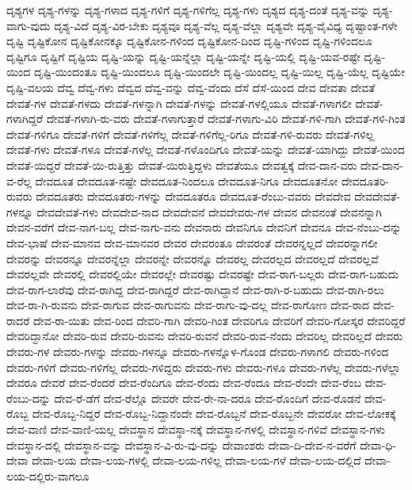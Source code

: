 {ದೃಶ್ಯಗಳ
ದೃಶ್ಯ-ಗಳನ್ನು
ದೃಶ್ಯ-ಗಳಾದ
ದೃಶ್ಯ-ಗಳಿಗೆ
ದೃಶ್ಯ-ಗಳಿಗೆಲ್ಲ
ದೃಶ್ಯ-ಗಳು
ದೃಶ್ಯದ
ದೃಶ್ಯ-ದಂತೆ
ದೃಶ್ಯ-ವನ್ನು
ದೃಶ್ಯ-ವಾಗು-ವುದು
ದೃಶ್ಯ-ವಿದೆ
ದೃಶ್ಯ-ವಿರ-ಬೇಕು
ದೃಶ್ಯವೂ
ದೃಶ್ಯ-ವೆಲ್ಲ
ದೃಶ್ಯ-ವೆಲ್ಲಾ
ದೃಶ್ಯವೇ
ದೃಶ್ಯ-ವೈವಿಧ್ಯ
ದೃಷ್ಟಾಂತ-ಗಳೇ
ದೃಷ್ಟಿ
ದೃಷ್ಟಿಕೋನ
ದೃಷ್ಟಿಕೋನಕ್ಕೂ
ದೃಷ್ಟಿಕೋನ-ಗಳಿಂದ
ದೃಷ್ಟಿಕೋನ-ದಿಂದ
ದೃಷ್ಟಿ-ಗಳಿಂದ
ದೃಷ್ಟಿ-ಗಳಿಂದಲೂ
ದೃಷ್ಟಿಗೂ
ದೃಷ್ಟಿಗೆ
ದೃಷ್ಟಿಯ
ದೃಷ್ಟಿ-ಯನ್ನು
ದೃಷ್ಟಿ-ಯನ್ನೆಲ್ಲಾ
ದೃಷ್ಟಿ-ಯನ್ನೇ
ದೃಷ್ಟಿ-ಯಲ್ಲಿ
ದೃಷ್ಟಿ-ಯವ-ರಷ್ಟೇ
ದೃಷ್ಟಿ-ಯಿಂದ
ದೃಷ್ಟಿ-ಯಿಂದಂತೂ
ದೃಷ್ಟಿ-ಯಿಂದಲೂ
ದೃಷ್ಟಿ-ಯಿಂದಲೇ
ದೃಷ್ಟಿ-ಯಿಂದಲ್ಲ
ದೃಷ್ಟಿ-ಯಿಲ್ಲ
ದೃಷ್ಟಿ-ಯೆಲ್ಲ
ದೃಷ್ಟಿಯೇ
ದೃಷ್ಟಿ-ವಲಯ
ದೆವ್ವ
ದೆವ್ವ-ಗಳು
ದೆವ್ವದ
ದೆವ್ವ-ವನ್ನು
ದೆವ್ವ-ವೆಂದು
ದೆಸೆ
ದೆಸೆ-ಯಿಂದ
ದೇವ
ದೇವತಾ
ದೇವತೆ
ದೇವತೆ-ಗಳ
ದೇವತೆ-ಗಳದು
ದೇವತೆ-ಗಳನ್ನಾಗಿ
ದೇವತೆ-ಗಳನ್ನು
ದೇವತೆ-ಗಳಲ್ಲಿಯೂ
ದೇವತೆ-ಗಳಾಗಲೀ
ದೇವತೆ-ಗಳಾಗಿದ್ದರೆ
ದೇವತೆ-ಗಳಾಗಿ-ರು-ವರು
ದೇವತೆ-ಗಳಾಗುತ್ತಾರೆ
ದೇವತೆ-ಗಳಾಗು-ವಿರಿ
ದೇವತೆ-ಗಳಿ-ಗಾಗಿ
ದೇವತೆ-ಗಳಿ-ಗಿಂತ
ದೇವತೆ-ಗಳಿಗೂ
ದೇವತೆ-ಗಳಿಗೆ
ದೇವತೆ-ಗಳಿಗೆಲ್ಲ
ದೇವತೆ-ಗಳಿಗೆಲ್ಲ-ರಿಗೂ
ದೇವತೆ-ಗಳಿ-ರುವರು
ದೇವತೆ-ಗಳಿಲ್ಲ
ದೇವತೆ-ಗಳು
ದೇವತೆ-ಗಳೂ
ದೇವತೆ-ಗಳೆಲ್ಲ
ದೇವತೆ-ಗಳೊಂದಿಗೂ
ದೇವತೆ-ಯನ್ನು
ದೇವತೆ-ಯಾಗಿದ್ದು
ದೇವತೆ-ಯಿಂದ
ದೇವತೆ-ಯಿದ್ದರೆ
ದೇವತೆ-ಯಿ-ರುತ್ತಿತ್ತು
ದೇವತೆ-ಯಿರುತ್ತಿದ್ದಳು
ದೇವತೆಯೂ
ದೇವತ್ವಕ್ಕೆ
ದೇವ-ದಾನ-ವರು
ದೇವ-ದಾನ-ವ-ರೆಲ್ಲ
ದೇವದೂತ
ದೇವದೂತ-ನಷ್ಟೇ
ದೇವದೂತ-ನಿಂದಲೂ
ದೇವದೂತ-ನಿಗೂ
ದೇವದೂತನೋ
ದೇವದೂತರಿ-ರುವರು
ದೇವದೂತರು
ದೇವದೂತರು-ಗಳನ್ನು
ದೇವದೂತರೂ
ದೇವದೂತ-ರೆಂಬು-ವವರು
ದೇವದೇವ
ದೇವದೇವತೆ-ಗಳನ್ನೂ
ದೇವದೇವತೆ-ಗಳು
ದೇವದೇವ-ನಾದ
ದೇವದೇವನೆ
ದೇವದೇವರು-ಗಳ
ದೇವನ
ದೇವನಂತೆ
ದೇವನನ್ನಾಗಿ
ದೇವನ-ವರೆಗೆ
ದೇವ-ನಾಗ-ಬಲ್ಲ
ದೇವ-ನಾಗು-ವನು
ದೇವನಾರು
ದೇವನಿಗೂ
ದೇವನಿಗೆ
ದೇವನೂ
ದೇವ-ನೆಂಬು-ದನ್ನು
ದೇವ-ಭಾಷೆ
ದೇವ-ಮಾನವ
ದೇವ-ಮಾನವರ
ದೇವರ
ದೇವರಂತೂ
ದೇವರಂತೆ
ದೇವರನ್ನಲ್ಲದೆ
ದೇವರನ್ನಾಗಲೀ
ದೇವರನ್ನು
ದೇವರನ್ನೂ
ದೇವರನ್ನೆಲ್ಲಾ
ದೇವರನ್ನೇ
ದೇವರನ್ನೊ
ದೇವರಲ್ಲ
ದೇವರಲ್ಲದ
ದೇವರಲ್ಲದೆ
ದೇವರಲ್ಲವೆ
ದೇವರಲ್ಲವೇ
ದೇವರಲ್ಲಿ
ದೇವರಲ್ಲಿಯೇ
ದೇವರಲ್ಲೇ
ದೇವರಷ್ಟು
ದೇವರಷ್ಟೇ
ದೇವ-ರಾಗ-ಬಲ್ಲರು
ದೇವ-ರಾಗ-ಬಹುದು
ದೇವ-ರಾಗ-ಲಾರೆವು
ದೇವ-ರಾಗಿದ್ದ
ದೇವ-ರಾಗಿದ್ದರೆ
ದೇವ-ರಾಗಿದ್ದಾನೆ
ದೇವ-ರಾಗಿ-ರ-ಬಹುದು
ದೇವ-ರಾಗಿ-ರಲು
ದೇವ-ರಾ-ಗಿ-ರುವನು
ದೇವ-ರಾಗುವ
ದೇವ-ರಾಗುವನು
ದೇವ-ರಾಗು-ವು-ದಲ್ಲ
ದೇವ-ರಾಗೋಣ
ದೇವ-ರಾದ
ದೇವ-ರಾದರೆ
ದೇವ-ರಾ-ಯಿತು
ದೇವ-ರಿಂದ
ದೇವರಿ-ಗಾಗಿ
ದೇವರಿ-ಗಿಂತ
ದೇವರಿಗೂ
ದೇವರಿಗೆ
ದೇವರಿ-ಗೋಸ್ಕರ
ದೇವರಿದ್ದರೆ
ದೇವರಿದ್ದಾನೋ
ದೇವರಿ-ರುವ
ದೇವರಿ-ರುವನು
ದೇವರಿ-ರುವನೆ
ದೇವರಿ-ರುವ-ನೆಂದು
ದೇವರಿಲ್ಲ
ದೇವರಿಲ್ಲದೆ
ದೇವರು
ದೇವರು-ಗಳ
ದೇವರು-ಗಳನ್ನು
ದೇವರು-ಗಳನ್ನೂ
ದೇವರು-ಗಳನ್ನೊಳ-ಗೊಂಡ
ದೇವರು-ಗಳಾಗಲಿ
ದೇವರು-ಗಳಿಂದ
ದೇವರು-ಗಳಿಗೆ
ದೇವರು-ಗಳಿಗೆಲ್ಲ
ದೇವರು-ಗಳಿದ್ದರು
ದೇವರು-ಗಳು
ದೇವರು-ಗಳೂ
ದೇವರು-ಗಳೆಲ್ಲ
ದೇವರು-ಗಳೆಲ್ಲಾ
ದೇವರೂ
ದೇವರೆ
ದೇವ-ರೆಂದರೆ
ದೇವ-ರೆಂದಿಗೂ
ದೇವ-ರೆಂದು
ದೇವ-ರೆಂದೂ
ದೇವ-ರೆಂದೇ
ದೇವ-ರೆಂಬ
ದೇವ-ರೆಂಬು-ದನ್ನು
ದೇವ-ರೆ-ಡೆಗೆ
ದೇವ-ರೆಲ್ಲೊ
ದೇವರೇ
ದೇವ-ರೇ-ನಾ-ದರೂ
ದೇವ-ರೊಂದಿಗೆ
ದೇವ-ರೊಡನೆ
ದೇವ-ರೊಬ್ಬ
ದೇವ-ರೊಬ್ಬ-ನಿದ್ದರೆ
ದೇವ-ರೊಬ್ಬ-ನಿದ್ದಾನೆಂದೇ
ದೇವ-ರೊಬ್ಬನೆ
ದೇವ-ರೊಬ್ಬನೇ
ದೇವರೋ
ದೇವ-ಲೋಕಕ್ಕೆ
ದೇವ-ವಾಣಿ
ದೇವ-ವಾಣಿ-ಯಲ್ಲ
ದೇವಸ್ಥಾನ
ದೇವಸ್ಥಾ-ನಕ್ಕೆ
ದೇವಸ್ಥಾನ-ಗಳಲ್ಲಿ
ದೇವಸ್ಥಾನ-ಗಳಿವೆ
ದೇವಸ್ಥಾನ-ಗಳು
ದೇವಸ್ಥಾನ-ದಲ್ಲಿ
ದೇವಸ್ಥಾನ-ವನ್ನು
ದೇವಸ್ಥಾನ-ವಿ-ರು-ವು-ದನ್ನು
ದೇವಾಂಶರು
ದೇವಾ-ದಿ-ದೇವ-ನ-ವರೆಗೆ
ದೇವಾ-ಧಿ-ದೇವಾ
ದೇವಾ-ಲಯ
ದೇವಾ-ಲಯ-ಗಳಲ್ಲಿ
ದೇವಾ-ಲಯ-ಗಳಿಲ್ಲ
ದೇವಾ-ಲಯ-ಗಳೆ
ದೇವಾ-ಲಯ-ದಲ್ಲಿದೆ
ದೇವಾ-ಲಯ-ದಲ್ಲಿರು-ವಾಗಲೂ
}
